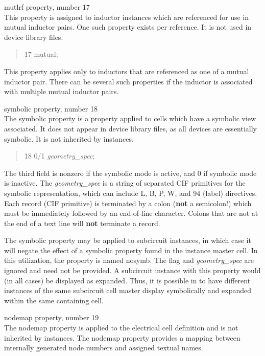 \begin{description}
\item{\et mutlrf} property, number 17\\
This property is assigned to inductor instances which are referenced
for use in mutual inductor pairs.  One such property exists per
reference.  It is not used in device library files.
\begin{quote} 17 mutual;
\end{quote}
This property applies only to inductors that are referenced as one of
a mutual inductor pair.  There can be several such properties if the
inductor is associated with multiple mutual inductor pairs.

\item{\et symbolic} property, number 18\\
The {\et symbolic} property is a property applied to cells which have
a symbolic view associated.  It does not appear in device library
files, as all devices are essentially symbolic.  It is not inherited by
instances.
\begin{quote} 18 0/1 {\it geometry\_spec};
\end{quote}
The third field is nonzero if the symbolic mode is active, and 0
if symbolic mode is inactive.  The {\it geometry\_spec} is a string of
separated CIF primitives for the symbolic representation, which can
include L, B, P, W, and 94 (label) directives.  Each record (CIF
primitive) is terminated by a colon ({\bf not} a semicolon!) which
must be immediately followed by an end-of-line character.  Colons that
are not at the end of a text line will {\bf not} terminate a record.

The {\et symbolic} property may be applied to subcircuit instances, in
which case it will negate the effect of a {\et symbolic} property
found in the instance master cell.  In this utilization, the property
is named {\cb nosymb}.  The flag and {\it geometry\_spec} are ignored
and need not be provided.  A subcircuit instance with this property
would (in all cases) be displayed as expanded.  Thus, it is possible
in {\Xic} to have different instances of the same subcircuit cell
master display symbolically and expanded within the same containing
cell.

\item{\et nodemap} property, number 19\\
The {\et nodemap} property is applied to the electrical cell
definition and is not inherited by instances.  The {\et nodemap}
property provides a mapping between internally generated node numbers
and assigned textual names. 


\end{description}
